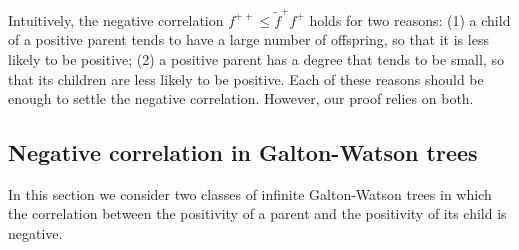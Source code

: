 \documentclass[11pt]{article}
\numberwithin{equation}{section}
\theoremstyle{plain}
\newcommand{\tf}{{\tilde{f}}}
\begin{document}
Intuitively, the negative correlation $f^{++} \leq \tf^+f^+$ holds for two reasons: (1) a child of a positive parent tends to have a large number of offspring, so that it is less likely to be positive; (2) a positive parent has a degree that tends to be small, so that its children are less likely to be positive. Each of these reasons should be enough to settle the negative correlation. However, our proof relies on both.



\subsection{Negative correlation in Galton-Watson trees}
\label{ap:Ex}

In this section we consider two classes of infinite Galton-Watson trees in which the correlation between the positivity of a parent and the positivity of its child is negative.
\end{document}
